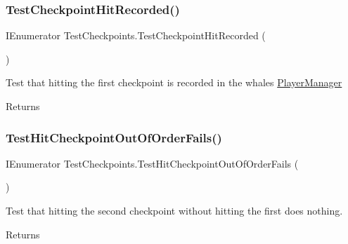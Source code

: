 \subsubsection{\texorpdfstring{Test\+Checkpoint\+Hit\+Recorded()}{TestCheckpointHitRecorded()}}
{\footnotesize\ttfamily I\+Enumerator Test\+Checkpoints.\+Test\+Checkpoint\+Hit\+Recorded (\begin{DoxyParamCaption}{ }\end{DoxyParamCaption})}



Test that hitting the first checkpoint is recorded in the whale\textquotesingle{}s \hyperlink{class_player_manager}{Player\+Manager} 

\begin{DoxyReturn}{Returns}

\end{DoxyReturn}
\mbox{\label{class_test_checkpoints_aae8a7ff45f25ef40dc7fb7634f9cb8b7}} 
\subsubsection{\texorpdfstring{Test\+Hit\+Checkpoint\+Out\+Of\+Order\+Fails()}{TestHitCheckpointOutOfOrderFails()}}
{\footnotesize\ttfamily I\+Enumerator Test\+Checkpoints.\+Test\+Hit\+Checkpoint\+Out\+Of\+Order\+Fails (\begin{DoxyParamCaption}{ }\end{DoxyParamCaption})}



Test that hitting the second checkpoint without hitting the first does nothing. 

\begin{DoxyReturn}{Returns}

\end{DoxyReturn}
\mbox{\label{class_test_checkpoints_a63efe64ce70c26ce129a9314bd005a88}} 
